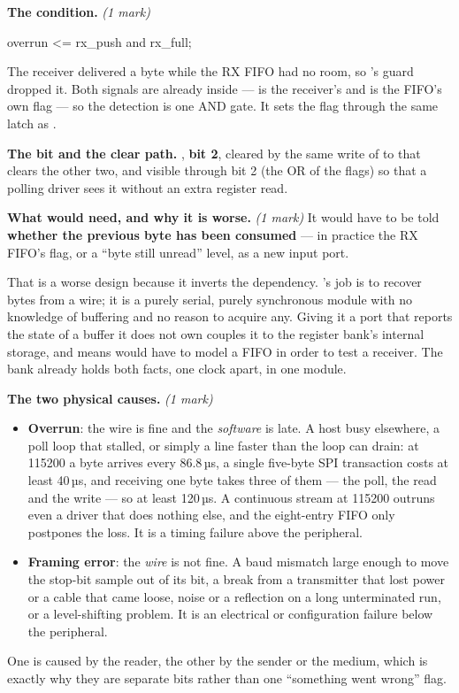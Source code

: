 \textbf{The condition.} \textit{(1 mark)}

\begin{vhdlcode}
overrun <= rx_push and rx_full;
\end{vhdlcode}

\noindent The receiver delivered a byte while the RX FIFO had no room, so 's
 guard dropped it. Both signals are already inside  ---
 is the receiver's  and  is the FIFO's own flag --- so the
detection is one AND gate. It sets the flag through the same latch as .

\textbf{The bit and the clear path.} , \textbf{ bit 2}, cleared
by the same write of  to  that clears the other two, and visible
through  bit 2 (the OR of the flags) so that a polling driver sees it without an extra
register read.

\textbf{What  would need, and why it is worse.} \textit{(1 mark)} It would have to be
told \textbf{whether the previous byte has been consumed} --- in practice the RX FIFO's 
flag, or a ``byte still unread'' level, as a new input port.

That is a worse design because it inverts the dependency. 's job is to recover bytes
from a wire; it is a purely serial, purely synchronous module with no knowledge of buffering and no
reason to acquire any. Giving it a port that reports the state of a buffer it does not own couples it
to the register bank's internal storage, and means  would have to model a FIFO in
order to test a receiver. The bank already holds both facts, one clock apart, in one module.

\textbf{The two physical causes.} \textit{(1 mark)}
\begin{itemize}
  \item \textbf{Overrun}: the wire is fine and the \emph{software} is late. A host busy elsewhere, a
    poll loop that stalled, or simply a line faster than the loop can drain: at 115200 a byte
    arrives every 86.8\,µs, a single five-byte SPI transaction costs at least 40\,µs, and receiving
    one byte takes three of them --- the  poll, the  read and the
     write --- so at least 120\,µs. A continuous stream at 115200 outruns even a driver
    that does nothing else, and the eight-entry FIFO only postpones the loss. It is a timing failure
    above the peripheral.
  \item \textbf{Framing error}: the \emph{wire} is not fine. A baud mismatch large enough to move the
    stop-bit sample out of its bit, a break from a transmitter that lost power or a cable that came
    loose, noise or a reflection on a long unterminated run, or a level-shifting problem. It is an
    electrical or configuration failure below the peripheral.
\end{itemize}
One is caused by the reader, the other by the sender or the medium, which is exactly why they are
separate bits rather than one ``something went wrong'' flag.

